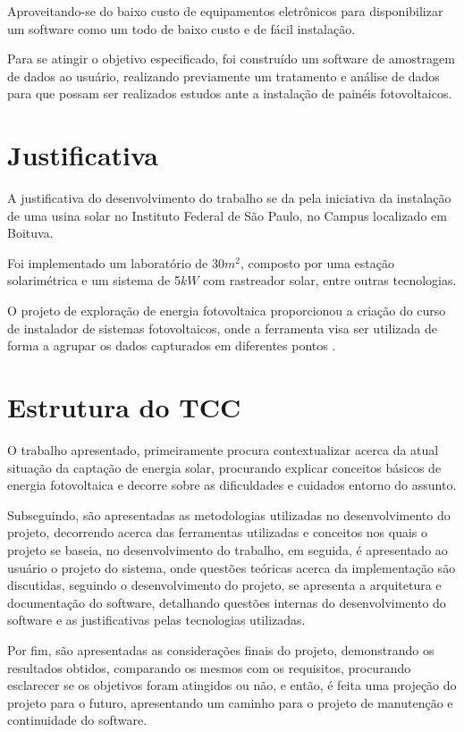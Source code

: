 Aproveitando-se do baixo custo de equipamentos eletrônicos para disponibilizar um software como um todo de baixo custo e de fácil instalação.

Para se atingir o objetivo especificado, foi construído um software de amostragem de dados ao usuário, realizando previamente um tratamento e análise de dados para que possam ser realizados estudos ante a instalação de painéis fotovoltaicos.

\section{Justificativa}

A justificativa do desenvolvimento do trabalho se da pela iniciativa da instalação de uma usina solar no Instituto Federal de São Paulo, no Campus localizado em Boituva.

Foi implementado um laboratório de 30$m^2$, composto por uma estação solarimétrica e um sistema de 5$kW$ com rastreador solar, entre outras tecnologias.

O projeto de exploração de energia fotovoltaica proporcionou a criação do curso de instalador de sistemas fotovoltaicos, onde a ferramenta visa ser utilizada de forma a agrupar os dados capturados em diferentes pontos \cite{solar_ifsp_btv}.

\section{Estrutura do TCC}

O trabalho apresentado, primeiramente procura contextualizar acerca da atual situação da captação de energia solar, procurando explicar conceitos básicos de energia fotovoltaica e decorre sobre as dificuldades e cuidados entorno do assunto.

Subseguindo, são apresentadas as metodologias utilizadas no desenvolvimento do projeto, decorrendo acerca das ferramentas utilizadas e conceitos nos quais o projeto se baseia, no desenvolvimento do trabalho, em seguida, é apresentado ao usuário o projeto do sistema, onde questões teóricas acerca da implementação são discutidas, seguindo o desenvolvimento do projeto, se apresenta a arquitetura e documentação do software, detalhando questões internas do desenvolvimento do software e as justificativas pelas tecnologias utilizadas.

Por fim, são apresentadas as considerações finais do projeto, demonstrando os resultados obtidos, comparando os mesmos com os requisitos, procurando esclarecer se os objetivos foram atingidos ou não, e então, é feita uma projeção do projeto para o futuro, apresentando um caminho para o projeto de manutenção e continuidade do software.

